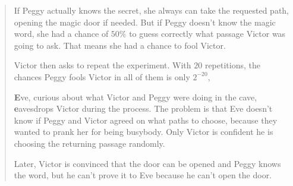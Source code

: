 \begin{quote}
	If Peggy actually knows the secret, she always can take the requested path, opening the magic door if needed.
	But if Peggy doesn't know the magic word, she had a chance of $50\%$ to guess correctly what passage Victor was going to ask. That means she had a chance to fool Victor.
	
	Victor then asks to repeat the experiment. With $20$ repetitions, the chances Peggy fools Victor in all of them is only  $2^{-20}$,
	
	\textbf{E}ve, curious about what Victor and Peggy were doing in the cave, \textbf{e}avesdrops Victor during the process. The problem is that Eve doesn't know if Peggy and Victor agreed on what paths to choose, because they wanted to prank her for being busybody. Only Victor is confident he is choosing the returning passage randomly.
	
	Later, Victor is convinced that the door can be opened and Peggy knows the word, but he can't prove it to Eve because he can't open the door. 
\end{quote}





